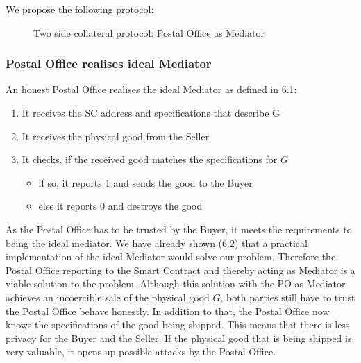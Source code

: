 \documentclass{cacthesis}
\begin{document}
We propose the following protocol:
\begin{figure}[htb!]
    \centering
    \caption{Two side collateral protocol: Postal Office as Mediator}
    \label{pro:two-side-collateral-postal}
\end{figure}

\subsubsection{Postal Office realises ideal Mediator}
An honest Postal Office realises the ideal Mediator as defined in 6.1:
\begin{enumerate}
    \item It receives the SC address and specifications that describe G
    \item It receives the physical good from the Seller
    \item It checks, if the received good matches the specifications for $G$
        \begin{itemize}
            \item if so, it reports 1 and sends the good to the Buyer
            \item else it reports 0 and destroys the good
        \end{itemize}
\end{enumerate}
As the Postal Office has to be trusted by the Buyer, it meets the requirements to being the ideal mediator. We have already shown (6.2) that a practical implementation of the ideal Mediator would solve our problem. Therefore the Postal Office reporting to the Smart Contract and thereby acting as Mediator is a viable solution to the problem.
Although this solution with the PO as Mediator achieves an incoercible sale of the physical good $G$, both parties still have to trust the Postal Office behave honestly.
In addition to that, the Postal Office now knows the specifications of the good being shipped. This means that there is less privacy for the Buyer and the Seller. If the physical good that is being shipped is very valuable, it opens up possible attacks by the Postal Office.\newline
\end{document}
